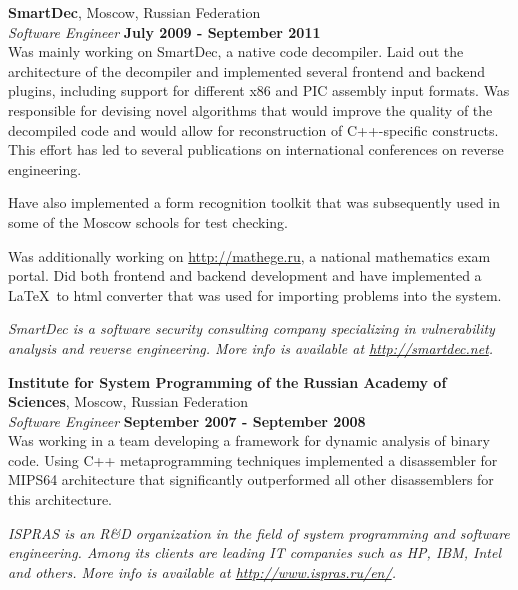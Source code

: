 \documentclass[margin,line]{CV}
\def\superofficial{}
\begin{document}
\begin{resume}
    
    \textbf{SmartDec}, Moscow, Russian Federation \vspace{2mm}\\\vspace{1mm}%
    \textsl{Software Engineer} \hfill \textbf{July 2009 - September 2011}\\
    Was mainly working on SmartDec, a native code decompiler. Laid out the architecture of the decompiler and implemented several frontend and backend plugins, including support for different x86 and PIC assembly input formats. Was responsible for devising novel algorithms that would improve the quality of the decompiled code and would allow for reconstruction of C++-specific constructs. This effort has led to several publications on international conferences on reverse engineering.

    Have also implemented a form recognition toolkit that was subsequently used in some of the Moscow schools for test checking. 

    Was additionally working on \url{http://mathege.ru}, a national mathematics exam portal. Did both frontend and backend development and have implemented a \LaTeX~to html converter that was used for importing problems into the system.

\ifdefined\superofficial
    {\footnotesize\textit{SmartDec is a software security consulting company specializing in vulnerability analysis and reverse engineering. More info is available at \url{http://smartdec.net}.}}
\fi
    
    
    \textbf{Institute for System Programming of the Russian Academy of Sciences}, Moscow, Russian Federation \vspace{2mm}\\\vspace{1mm}%
    \textsl{Software Engineer} \hfill \textbf{September 2007 - September 2008}\\
    Was working in a team developing a framework for dynamic analysis of binary code. Using C++ metaprogramming techniques implemented a disassembler for MIPS64 architecture that significantly outperformed all other disassemblers for this architecture.

\ifdefined\superofficial
    {\footnotesize\textit{ISPRAS is an R\&D organization in the field of system programming and software engineering. Among its clients are leading IT companies such as HP, IBM, Intel and others. More info is available at \url{http://www.ispras.ru/en/}.}}
\fi
    

\end{resume}
\end{document}
